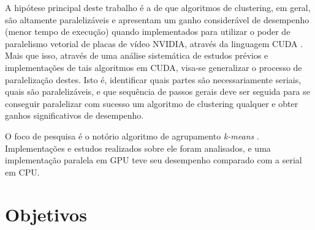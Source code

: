 \documentclass[12pt,
openright, 
oneside, %
a4paper,    %
brazil]{facom-ufu-abntex2}
\def\qntAlgrtm{dois}
\begin{document}
A hipótese principal deste trabalho é a de que algoritmos de clustering, em geral, são altamente paralelizáveis e apresentam um ganho considerável de desempenho (menor tempo de execução) quando implementados para utilizar o poder de paralelismo vetorial de placas de vídeo NVIDIA, através da linguagem CUDA \cite{CUDAZone}. Mais que isso, através de uma análise sistemática de estudos prévios e implementações de tais algoritmos em CUDA, visa-se generalizar o processo de paralelização destes. Isto é, identificar quais partes são necessariamente seriais, quais são paralelizáveis, e que sequência de passos gerais deve ser seguida para se conseguir paralelizar com sucesso um algoritmo de clustering qualquer e obter ganhos significativos de desempenho.



O foco de pesquisa é o notório algoritmo de agrupamento \textit{k-means} \cite{GPU-accelerated-K-Means}. Implementações e estudos realizados sobre ele foram analisados, e uma implementação paralela em GPU teve seu desempenho comparado com a serial em CPU.







\section{Objetivos}
\end{document}
